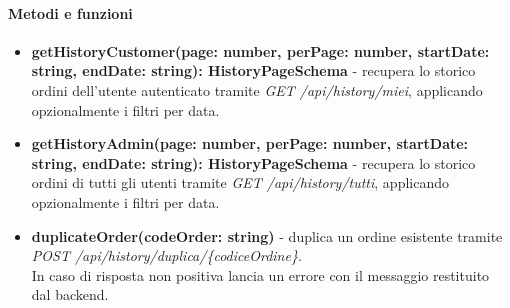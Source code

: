 \paragraph{Metodi e funzioni}
\begin{itemize}
	\item \textbf{getHistoryCustomer(page: number, perPage: number, startDate: string, endDate: string): HistoryPageSchema} - recupera lo storico ordini dell'utente autenticato tramite \textit{GET /api/history/miei}, applicando opzionalmente i filtri per data.
	\item \textbf{getHistoryAdmin(page: number, perPage: number, startDate: string, endDate: string): HistoryPageSchema} - recupera lo storico ordini di tutti gli utenti tramite \textit{GET /api/history/tutti}, applicando opzionalmente i filtri per data.
	\item \textbf{duplicateOrder(codeOrder: string)} - duplica un ordine esistente tramite \textit{POST /api/history/duplica/\{codiceOrdine\}}.\\
	In caso di risposta non positiva lancia un errore con il messaggio restituito dal backend.
\end{itemize}
